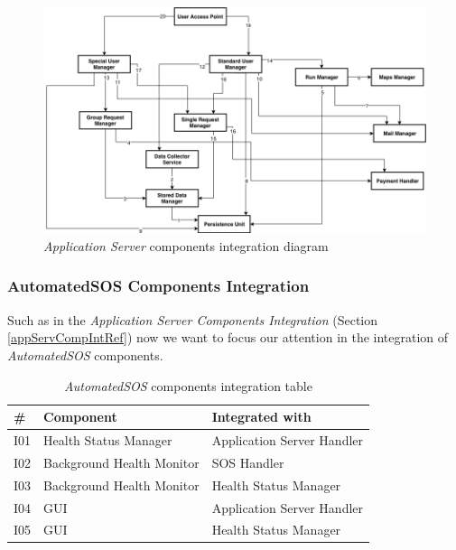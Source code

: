 \begin{figure}[H]
  \begin{center}
  	\includegraphics[width=\textwidth]{./img/appServerIntegration.png}
    \hspace{0.05\linewidth}
    \centering
    \caption{\textit{Application Server} components integration diagram}
		\label{img:appServerIntegrationDiagram}
    \end{center}
\end{figure}


\subsubsection{AutomatedSOS Components Integration}
Such as in the \textit{Application Server Components Integration} (Section \ref{appServCompIntRef}) now we want to focus our attention in the integration of \textit{AutomatedSOS} components.

\begin{center}
\begin{table}[H]
\begin{tabular}{ | l | p{} | p{} |}
  \hline
    \textbf{\#} & \textbf{Component} & \textbf{Integrated with} \\ \hline
    I01  & Health Status Manager  & Application Server Handler \\ \hline
    I02  & Background Health Monitor  & SOS Handler \\ \hline
    I03  & Background Health Monitor  & Health Status Manager \\ \hline
    I04  & GUI  & Application Server Handler \\ \hline
    I05  & GUI & Health Status Manager \\ \hline
\end{tabular}
\caption{\textit{AutomatedSOS} components integration table}
\label{table:automatedIntegrationTable}
\end{table}
\end{center}

